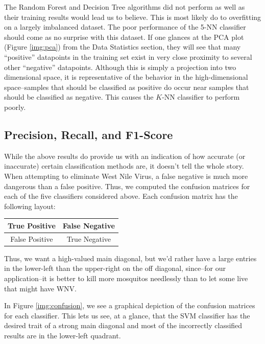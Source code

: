 \documentclass{article} %
\begin{document}
The Random Forest and Decision Tree algorithms did not perform as well as their training results would lead us to believe.  This is most likely do to overfitting on a largely imbalanced dataset.  The poor performance of the 5-NN classifier should come as no surprise with this dataset.  If one glances at the PCA plot (Figure \ref{img:pca}) from the Data Statistics section, they will see that many ``positive'' datapoints in the training set exist in very close proximity to several other ``negative'' datapoints.  Although this is simply a projection into two dimensional space, it is representative of the behavior in the high-dimensional space--samples that should be classified as positive do occur near samples that should be classified as negative.  This causes the $K$-NN classifier to perform poorly.


\subsection{Precision, Recall, and F1-Score}
While the above results do provide us with an indication of how accurate (or inaccurate) certain classification methods are, it doesn't tell the whole story.  When attempting to eliminate West Nile Virus, a false negative is much more dangerous than a false positive.  Thus, we computed the confusion matrices for each of the five classifiers considered above.  Each confusion matrix has the following layout:
\begin{center}\begin{tabular}{|c|c|}\hline
True Positive & False Negative \\\hline
False Positive & True Negative\\\hline
\end{tabular}\end{center}

Thus, we want a high-valued main diagonal, but we'd rather have a large entries in the lower-left than the upper-right on the off diagonal, since--for our application--it is better to kill more mosquitos needlessly than to let some live that might have WNV.

In Figure \ref{img:confusion}, we see a graphical depiction of the confusion matrices for each classifier.  This lets us see, at a glance, that the SVM classifier has the desired trait of a strong main diagonal and most of the incorrectly classified results are in the lower-left quadrant.
\end{document}
